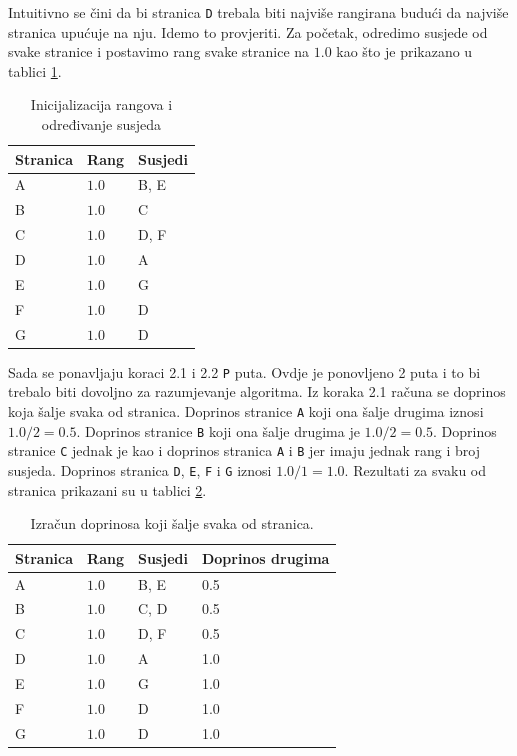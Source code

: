 \documentclass[times, utf8, zavrsni, numeric]{fer}
\begin{document}
Intuitivno se čini da bi stranica \texttt{D} trebala biti najviše rangirana budući da najviše stranica upućuje na nju. Idemo to provjeriti. Za početak, odredimo susjede od svake stranice i postavimo rang svake stranice na $1.0$ kao što je prikazano u tablici \ref{tbl:pageRankKorak1}.

\begin{table}[htb]
\caption{Inicijalizacija rangova i određivanje susjeda}
\label{tbl:pageRankKorak1}
\centering
\begin{tabular}{lll} 
\hline
Stranica & Rang & Susjedi \\
\hline
A & $1.0$ & B, E\\
B & $1.0$ & C\\
C & $1.0$ & D, F\\
D & $1.0$ & A\\
E & $1.0$ & G\\
F & $1.0$ & D\\
G & $1.0$ & D\\
\hline
\end{tabular}
\end{table}

Sada se ponavljaju koraci 2.1 i 2.2 \texttt{P} puta. Ovdje je ponovljeno 2 puta i to bi trebalo biti dovoljno za razumjevanje algoritma.
Iz koraka 2.1 računa se doprinos koja šalje svaka od stranica. Doprinos stranice \texttt{A} koji ona šalje drugima iznosi $1.0 / 2 = 0.5$. Doprinos stranice \texttt{B} koji ona šalje drugima je $1.0 / 2 = 0.5$. Doprinos stranice \texttt{C} jednak je kao i doprinos stranica \texttt{A} i \texttt{B} jer imaju jednak rang i broj susjeda. Doprinos stranica \texttt{D}, \texttt{E}, \texttt{F} i \texttt{G} iznosi $1.0 / 1 = 1.0$. Rezultati za svaku od stranica prikazani su u tablici \ref{tbl:pageRankKorak21p1}.

\begin{table}[htb]
\caption{Izračun doprinosa koji šalje svaka od stranica.}
\label{tbl:pageRankKorak21p1}
\centering
\begin{tabular}{llll} 
\hline
Stranica & Rang & Susjedi & Doprinos drugima\\
\hline
A & $1.0$ & B, E & 0.5\\
B & $1.0$ & C, D & 0.5\\
C & $1.0$ & D, F & 0.5\\
D & $1.0$ & A & 1.0\\
E & $1.0$ & G & 1.0\\
F & $1.0$ & D & 1.0\\
G & $1.0$ & D & 1.0\\
\hline
\end{tabular}
\end{table}
\end{document}
